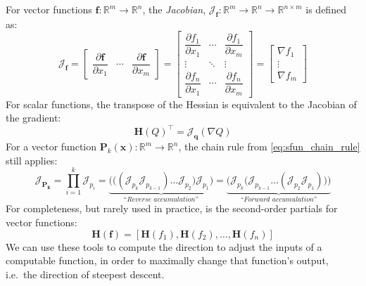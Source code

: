 %
For vector functions $\mathbf{f}: \mathbb{R}^m\rightarrow\mathbb{R}^n$, the \textit{Jacobian}, $\mathcal{J}_{\mathbf{f}}: \mathbb{R}^m\rightarrow\mathbb{R}^n\rightarrow\mathbb{R}^{n \times m}$ is defined as:
%
\begin{equation}
    \mathcal{J}_{\mathbf{f}} =
    \begin{bmatrix}
        \dfrac{\partial \mathbf{f}}{\partial x_1} & \cdots & \dfrac{\partial \mathbf{f}}{\partial x_m}
    \end{bmatrix} =
    \begin{bmatrix}
        \dfrac{\partial f_1}{\partial x_1} & \cdots & \dfrac{\partial f_1}{\partial x_m}\\
        \vdots & \ddots & \vdots\\
        \dfrac{\partial f_n}{\partial x_1} & \cdots & \dfrac{\partial f_n}{\partial x_m}
    \end{bmatrix} =
    \begin{bmatrix}
        \nabla f_1 \\
        \vdots \\
        \nabla f_m
    \end{bmatrix}
\end{equation}
%
For scalar functions, the transpose of the Hessian is equivalent to the Jacobian of the gradient:
%
\begin{equation}
    \mathbf{H}(Q)^\intercal = \mathcal{J}_\mathbf{q}(\nabla Q)
\end{equation}
%
For a vector function $\mathbf{P}_k(\mathbf{x}): \mathbb{R}^m\rightarrow\mathbb{R}^n$, the chain rule from \autoref{eq:sfun_chain_rule} still applies:
%
\begin{equation} \label{eq:vfun_chain_rule}
\mathcal{J}_\mathbf{P_k} = \displaystyle \prod_{i=1}^{k} \mathcal{J}_{p_i} = \underbrace{\bigg(\Big((\mathcal{J}_{p_k} \mathcal{J}_{p_{k-1}}) \dots \mathcal{J}_{p_2}\Big) \mathcal{J}_{p_1}\bigg)}_{\textit{``Reverse accumulation''}} = \underbrace{\bigg(\mathcal{J}_{p_k} \Big(\mathcal{J}_{p_{k-1}} \dots (\mathcal{J}_{p_2} \mathcal{J}_{p_1})\Big)\bigg)}_{\textit{``Forward accumulation''}}
\end{equation}
%
For completeness, but rarely used in practice, is the second-order partials for vector functions:
%
\begin{equation}
    \mathbf{H} (\mathbf {f} )=[\mathbf {H} (f_{1}), \mathbf {H} (f_{2}), \dots, \mathbf {H} (f_{n})]
\end{equation}
%
We can use these tools to compute the direction to adjust the inputs of a computable function, in order to maximally change that function's output, i.e.\ the direction of steepest descent.

